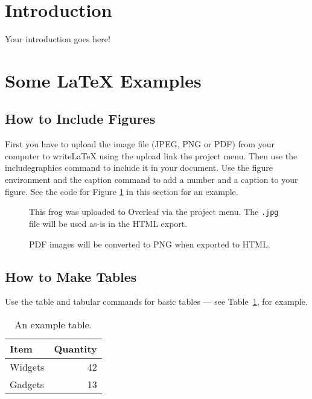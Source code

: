 \documentclass[graybox]{svmult}
\begin{document}
\section{Introduction}

Your introduction goes here! 

\section{Some \LaTeX{} Examples}
\label{sec:examples}

\subsection{How to Include Figures}

First you have to upload the image file (JPEG, PNG or PDF) from your computer to writeLaTeX using the upload link the project menu. Then use the includegraphics command to include it in your document. Use the figure environment and the caption command to add a number and a caption to your figure. See the code for Figure \ref{fig:frog} in this section for an example.

\begin{figure}
\centering
\caption{\label{fig:frog}This frog was uploaded to Overleaf via the project menu. The \texttt{.jpg} file will be used as-is in the HTML export.}
\end{figure}

\begin{figure}
\centering
\caption{PDF images will be converted to PNG when exported to HTML.}
\end{figure}

\subsection{How to Make Tables}

Use the table and tabular commands for basic tables --- see Table~\ref{tab:widgets}, for example.

\begin{table}
\centering
\begin{tabular}{l|r}
Item & Quantity \\\hline
Widgets & 42 \\
Gadgets & 13
\end{tabular}
\caption{\label{tab:widgets}An example table.}
\end{table}
\end{document}
